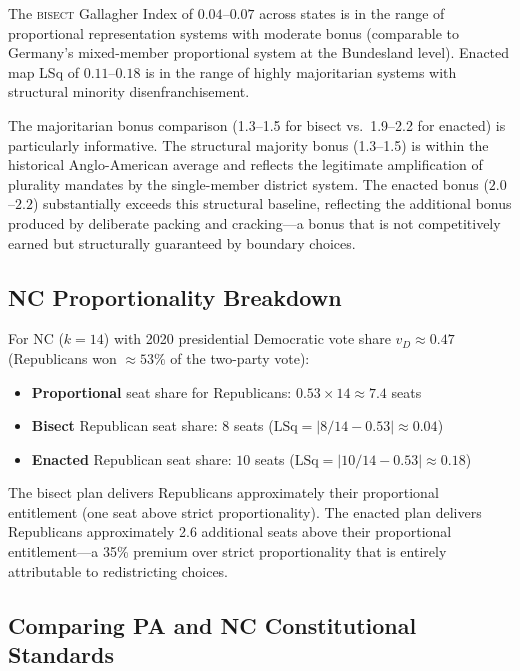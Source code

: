 The \textsc{bisect} Gallagher Index of $0.04$--$0.07$ across states is
in the range of proportional representation systems with moderate bonus
(comparable to Germany's mixed-member proportional system at the Bundesland level).
Enacted map LSq of $0.11$--$0.18$ is in the range of highly majoritarian
systems with structural minority disenfranchisement.

The majoritarian bonus comparison (1.3--1.5 for bisect vs.\ 1.9--2.2 for enacted)
is particularly informative. The structural majority bonus (1.3--1.5) is within
the historical Anglo-American average and reflects the legitimate amplification
of plurality mandates by the single-member district system. The enacted bonus
($2.0$--$2.2$) substantially exceeds this structural baseline, reflecting the
additional bonus produced by deliberate packing and cracking---a bonus that is
not competitively earned but structurally guaranteed by boundary choices.

\subsection{NC Proportionality Breakdown}

For NC ($k=14$) with 2020 presidential Democratic vote share $v_D \approx 0.47$
(Republicans won $\approx 53\%$ of the two-party vote):

\begin{itemize}
\item \textbf{Proportional} seat share for Republicans: $0.53 \times 14 \approx 7.4$ seats
\item \textbf{Bisect} Republican seat share: $8$ seats ($\text{LSq} = |8/14 - 0.53| \approx 0.04$)
\item \textbf{Enacted} Republican seat share: $10$ seats ($\text{LSq} = |10/14 - 0.53| \approx 0.18$)
\end{itemize}

The bisect plan delivers Republicans approximately their proportional entitlement
(one seat above strict proportionality). The enacted plan delivers Republicans
approximately 2.6 additional seats above their proportional entitlement---a 35\%
premium over strict proportionality that is entirely attributable to redistricting choices.

\subsection{Comparing PA and NC Constitutional Standards}

